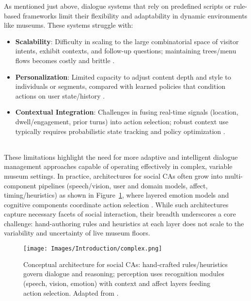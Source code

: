 \documentclass[12pt]{article}
\begin{document}
As mentioned just above, dialogue systems that rely on predefined scripts or rule-based frameworks limit their flexibility and adaptability in dynamic environments like museums. These systems struggle with:
\begin{itemize}
\item \textbf{Scalability}: Difficulty in scaling to the large combinatorial space of visitor intents, exhibit contexts, and follow-up questions; maintaining trees/menu flows becomes costly and brittle \citep{reimann2024dm}.
\item \textbf{Personalization}: Limited capacity to adjust content depth and style to individuals or segments, compared with learned policies that condition actions on user state/history \citep{kwan2023dplsurvey}.
\item \textbf{Contextual Integration}: Challenges in fusing real-time signals (location, dwell/engagement, prior turns) into action selection; robust context use typically requires probabilistic state tracking and policy optimization \citep{williams2007pomdp,reimann2024dm}.
\end{itemize}\\

These limitations highlight the need for more adaptive and intelligent dialogue management approaches capable of operating effectively in complex, variable museum settings. In practice, architectures for social CAs often grow into multi-component pipelines (speech/vision, user and domain models, affect, timing/heuristics) as shown in Figure~\ref{fig:complex-architecture}, where layered emotion models and cognitive components coordinate action selection \citep{opdenakker2012computational}. While such architectures capture necessary facets of social interaction, their breadth underscores a core challenge: hand-authoring rules and heuristics at each layer does not scale to the variability and uncertainty of live museum floors.\\

\begin{figure}[h]
\centering
\texttt{[image: Images/Introduction/complex.png]}
\caption{Conceptual architecture for social CAs: hand-crafted rules/heuristics govern dialogue and reasoning; perception uses recognition modules (speech, vision, emotion) with context and affect layers feeding action selection. Adapted from \citet{opdenakker2012computational}.}
\label{fig:complex-architecture}
\end{figure}
\end{document}
